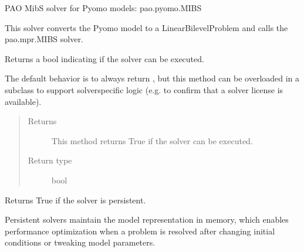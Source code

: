 \documentclass[letterpaper,10pt,english]{sphinxmanual}
\begin{document}
\begin{fulllineitems}
\label{\detokenize{reference/pyomo:pao.pyomo.solvers.mpr_solvers.PyomoSubmodelSolver_MIBS}}
PAO MibS solver for Pyomo models: pao.pyomo.MIBS

This solver converts the Pyomo model to a LinearBilevelProblem and
calls the pao.mpr.MIBS solver.

\begin{fulllineitems}
\label{\detokenize{reference/pyomo:pao.pyomo.solvers.mpr_solvers.PyomoSubmodelSolver_MIBS.available}}
Returns a bool indicating if the solver can be executed.

The default behavior is to always return , but this method
can be overloaded in a subclass to support solver\sphinxhyphen{}specific logic
(e.g.  to confirm that a solver license is available).
\begin{quote}\begin{description}
\item[{Returns}] \leavevmode
This method returns True if the solver can be executed.

\item[{Return type}] \leavevmode
bool

\end{description}\end{quote}

\end{fulllineitems}


\begin{fulllineitems}
\label{\detokenize{reference/pyomo:pao.pyomo.solvers.mpr_solvers.PyomoSubmodelSolver_MIBS.is_persistent}}
Returns True if the solver is persistent.

Persistent solvers maintain the model representation in memory,
which enables performance optimization when a problem is resolved
after changing initial conditions or tweaking model parameters.


\end{fulllineitems}
\end{fulllineitems}
\end{document}
